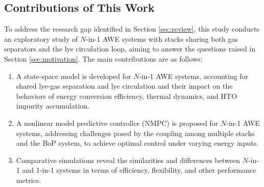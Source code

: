 \documentclass[review,3p,10pt]{elsarticle}
\begin{document}
\subsection{Contributions of This Work}
\label{sec:contribution}

%

To address the research gap identified in Section \ref{sec:review}, this study conducts an exploratory study of $N$-in-1 AWE systems with stacks sharing both gas separators and the lye circulation loop, aiming to answer the questions raised in Section \ref{sec:motivation}.
The main contributions are as follows:
\begin{enumerate}
  \item A state-space model is developed for $N$-in-1 AWE systems, accounting for shared lye-gas separation and lye circulation and their impact on the behaviors of energy conversion efficiency, thermal dynamics, and HTO impurity accumulation.

  \item A nonlinear model predictive controller (NMPC) is proposed for $N$-in-1 AWE systems, addressing challenges posed by the coupling among multiple stacks and the BoP system, to achieve optimal control under varying energy inputs.

  \item Comparative simulations reveal the similarities and differences between $N$-in-1 and 1-in-1 systems in terms of efficiency, flexibility, and other performance metrics. %
\end{enumerate}
\end{document}
